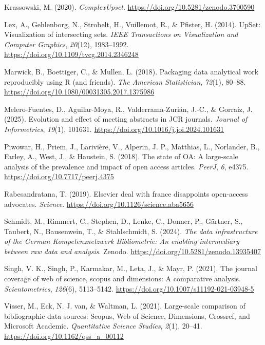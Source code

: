 \documentclass[a4paper,man,floatsintext,longtable,noextraspace,10pt]{apa6}
\newlength{\cslhangindent}
\newenvironment{CSLReferences}[2] %
{\begin{list}{}{%
  \setlength{\itemindent}{0pt}
  \setlength{\leftmargin}{0pt}
  \setlength{\parsep}{0pt}
  \ifodd #1
  \setlength{\leftmargin}{\cslhangindent}
  \setlength{\itemindent}{-1\cslhangindent}
  \fi
  \setlength{\itemsep}{#2\baselineskip}}}
{\end{list}}
\begin{document}
\begin{CSLReferences}{1}{0}
Krassowski, M. (2020). \emph{ComplexUpset}.
\url{https://doi.org/10.5281/zenodo.3700590}

Lex, A., Gehlenborg, N., Strobelt, H., Vuillemot, R., \& Pfister, H.
(2014). UpSet: Visualization of intersecting sets. \emph{IEEE
Transactions on Visualization and Computer Graphics}, \emph{20}(12),
1983--1992. \url{https://doi.org/10.1109/tvcg.2014.2346248}

Marwick, B., Boettiger, C., \& Mullen, L. (2018). Packaging data
analytical work reproducibly using {R} (and friends). \emph{The American
Statistician}, \emph{72}(1), 80--88.
\url{https://doi.org/10.1080/00031305.2017.1375986}

Melero-Fuentes, D., Aguilar-Moya, R., Valderrama-Zurián, J.-C., \&
Gorraiz, J. (2025). Evolution and effect of meeting abstracts in JCR
journals. \emph{Journal of Informetrics}, \emph{19}(1), 101631.
\url{https://doi.org/10.1016/j.joi.2024.101631}

Piwowar, H., Priem, J., Larivière, V., Alperin, J. P., Matthias, L.,
Norlander, B., Farley, A., West, J., \& Haustein, S. (2018). The state
of {OA}: A large-scale analysis of the prevalence and impact of open
access articles. \emph{{PeerJ}}, \emph{6}, e4375.
\url{https://doi.org/10.7717/peerj.4375}

Rabesandratana, T. (2019). Elsevier deal with france disappoints
open-access advocates. \emph{Science}.
\url{https://doi.org/10.1126/science.aba5656}

Schmidt, M., Rimmert, C., Stephen, D., Lenke, C., Donner, P., Gärtner,
S., Taubert, N., Bausenwein, T., \& Stahlschmidt, S. (2024). \emph{The
data infrastructure of the {German Kompetenznetzwerk Bibliometrie}: An
enabling intermediary between raw data and analysis}. Zenodo.
\url{https://doi.org/10.5281/zenodo.13935407}

Singh, V. K., Singh, P., Karmakar, M., Leta, J., \& Mayr, P. (2021). The
journal coverage of web of science, scopus and dimensions: A comparative
analysis. \emph{Scientometrics}, \emph{126}(6), 5113--5142.
\url{https://doi.org/10.1007/s11192-021-03948-5}

Visser, M., Eck, N. J. van, \& Waltman, L. (2021). Large-scale
comparison of bibliographic data sources: {Scopus, Web of Science,
Dimensions, Crossref, and Microsoft Academic}. \emph{Quantitative
Science Studies}, \emph{2}(1), 20--41.
\url{https://doi.org/10.1162/qss_a_00112}

\end{CSLReferences}
\end{document}
